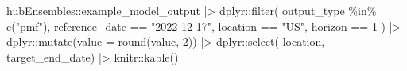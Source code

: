 \documentclass[
]{article}
\newenvironment{Shaded}{\begin{snugshade}}{\end{snugshade}}
\newcommand{\AttributeTok}[1]{\textcolor[rgb]{0.40,0.45,0.13}{#1}}
\newcommand{\DecValTok}[1]{\textcolor[rgb]{0.68,0.00,0.00}{#1}}
\newcommand{\FunctionTok}[1]{\textcolor[rgb]{0.28,0.35,0.67}{#1}}
\newcommand{\NormalTok}[1]{\textcolor[rgb]{0.00,0.23,0.31}{#1}}
\newcommand{\SpecialCharTok}[1]{\textcolor[rgb]{0.37,0.37,0.37}{#1}}
\newcommand{\StringTok}[1]{\textcolor[rgb]{0.13,0.47,0.30}{#1}}
\begin{document}
\begin{Shaded}
\begin{Highlighting}[]
\NormalTok{hubEnsembles}\SpecialCharTok{::}\NormalTok{example\_model\_output }\SpecialCharTok{|\textgreater{}}
\NormalTok{  dplyr}\SpecialCharTok{::}\FunctionTok{filter}\NormalTok{(}
\NormalTok{    output\_type }\SpecialCharTok{\%in\%} \FunctionTok{c}\NormalTok{(}\StringTok{"pmf"}\NormalTok{),}
\NormalTok{    reference\_date }\SpecialCharTok{==} \StringTok{"2022{-}12{-}17"}\NormalTok{,}
\NormalTok{    location }\SpecialCharTok{==} \StringTok{"US"}\NormalTok{,}
\NormalTok{    horizon }\SpecialCharTok{==} \DecValTok{1}
\NormalTok{  ) }\SpecialCharTok{|\textgreater{}}
\NormalTok{  dplyr}\SpecialCharTok{::}\FunctionTok{mutate}\NormalTok{(}\AttributeTok{value =} \FunctionTok{round}\NormalTok{(value, }\DecValTok{2}\NormalTok{)) }\SpecialCharTok{|\textgreater{}}
\NormalTok{  dplyr}\SpecialCharTok{::}\FunctionTok{select}\NormalTok{(}\SpecialCharTok{{-}}\NormalTok{location, }\SpecialCharTok{{-}}\NormalTok{target\_end\_date) }\SpecialCharTok{|\textgreater{}}
\NormalTok{  knitr}\SpecialCharTok{::}\FunctionTok{kable}\NormalTok{()}
\end{Highlighting}
\end{Shaded}
\end{document}
